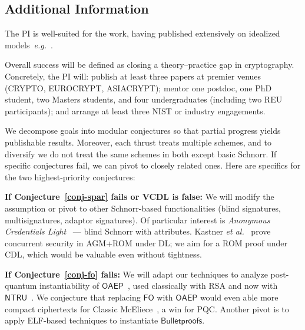 
\subsection{Additional Information}

  The PI is well-suited for the work, having  published extensively on idealized models~\emph{e.g.}~\cite{C:KilONeSmi10,JC:FulOneRey15,JC:KilONeSmi17,PKC:CaoONeZah20,PKC:OneZah21,TCC:BFHO22,AC:MurONeZah22,EPRINT:DLOS22,C:CFOS25}. 

Overall success will be defined as closing a theory–practice gap in  
cryptography. Concretely, the PI will: publish at least three papers at premier venues 
(CRYPTO, EUROCRYPT, ASIACRYPT); mentor one postdoc, one PhD student, two 
Masters students, and four undergraduates (including two REU participants); and 
arrange at least three NIST or industry engagements.

We  decompose goals into modular  conjectures so that partial progress yields publishable results. Moreover, each thrust treats multiple schemes, and to diversify we do not treat the same schemes in both except basic Schnorr. If specific conjectures fail, we can pivot to closely related ones. Here are  specifics for the two highest-priority conjectures:
\begin{newitemize}\setlength\itemsep{0.25em}
  \item \textbf{If Conjecture~\ref{conj-spar} fails or VCDL is false:} We will modify the assumption or pivot to other Schnorr-based functionalities (blind signatures, multisignatures, adaptor signatures). Of  particular interest is \emph{Anonymous Credentials Light}~\cite{CCS:BalLys13} --- blind Schnorr with attributes. Kastner \emph{et al.}~\cite{CCS:KasLosRen23} prove concurrent security in AGM+ROM under DL; we aim for a ROM proof under CDL, which would be valuable even without tightness.
  \item \textbf{If Conjecture~\ref{conj-fo} fails:} We will adapt our techniques to analyze  post-quantum instantiability of $\mathsf{OAEP}$~\cite{EC:BelRog94}, used classically with RSA and now with $\mathsf{NTRU}$~\cite{ntru2}. We   conjecture that  replacing $\mathsf{FO}$ with $\mathsf{OAEP}$ would even able more compact ciphertexts for Classic McEliece~\cite{mceliece}, a win for PQC. Another pivot is to apply ELF-based techniques to instantiate $\mathsf{Bulletproofs}$.
\end{newitemize}

